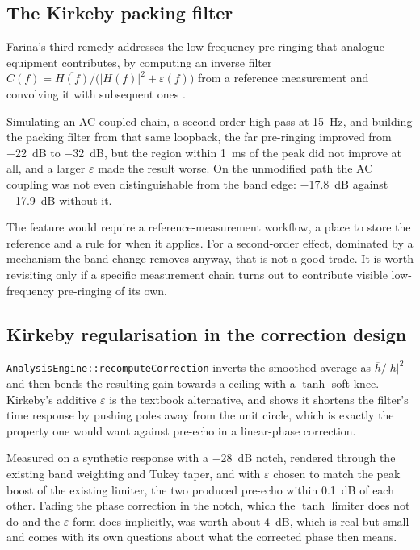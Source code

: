 \documentclass[11pt,a4paper]{article}
\newcommand{\code}[1]{\texttt{\small #1}}
\begin{document}
\subsection{The Kirkeby packing filter}

Farina's third remedy addresses the low-frequency pre-ringing that analogue
equipment contributes, by computing an inverse filter
$C(f) = \overline{H(f)} / \bigl( |H(f)|^2 + \varepsilon(f) \bigr)$ from a
reference measurement and convolving it with subsequent ones \cite{Farina2007,
Kirkeby1998}.

Simulating an AC-coupled chain, a second-order high-pass at \SI{15}{\hertz},
and building the packing filter from that same loopback, the far pre-ringing
improved from \SI{-22}{\dB} to \SI{-32}{\dB}, but the region within
\SI{1}{\milli\second} of the peak did not improve at all, and a larger
$\varepsilon$ made the result worse. On the unmodified path the AC coupling was
not even distinguishable from the band edge: \SI{-17.8}{\dB} against
\SI{-17.9}{\dB} without it.

The feature would require a reference-measurement workflow, a place to store the
reference and a rule for when it applies. For a second-order effect, dominated
by a mechanism the band change removes anyway, that is not a good trade. It is
worth revisiting only if a specific measurement chain turns out to contribute
visible low-frequency pre-ringing of its own.

\subsection{Kirkeby regularisation in the correction design}

\code{AnalysisEngine::recomputeCorrection} inverts the smoothed average as
$\overline{h}/|h|^2$ and then bends the resulting gain towards a ceiling with a
$\tanh$ soft knee. Kirkeby's additive $\varepsilon$ is the textbook alternative,
and \cite{Kirkeby1998} shows it shortens the filter's time response by pushing
poles away from the unit circle, which is exactly the property one would want
against pre-echo in a linear-phase correction.

Measured on a synthetic response with a \SI{-28}{\dB} notch, rendered through
the existing band weighting and Tukey taper, and with $\varepsilon$ chosen to
match the peak boost of the existing limiter, the two produced pre-echo within
\SI{0.1}{\dB} of each other. Fading the phase correction in the notch, which the
$\tanh$ limiter does not do and the $\varepsilon$ form does implicitly, was
worth about \SI{4}{\dB}, which is real but small and comes with its own
questions about what the corrected phase then means.
\end{document}
